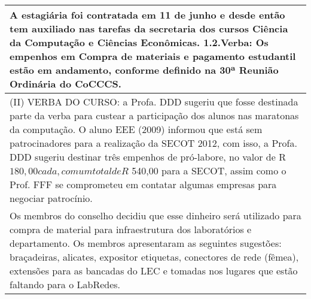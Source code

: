 \begin{longtable}{|p{17.5cm}|}
 \\ \hline 
A estagiária foi contratada em 11 de junho e desde então tem auxiliado nas tarefas da secretaria dos cursos Ciência da Computação e Ciências Econômicas. 1.2.Verba: Os empenhos em Compra de materiais e pagamento estudantil estão em andamento, conforme definido na 30ª Reunião Ordinária do CoCCCS.

 \\ \hline 
(II) VERBA DO CURSO: a Profa. DDD sugeriu que fosse destinada parte da verba para custear a participação dos alunos nas maratonas da computação. O aluno EEE (2009) informou que está sem patrocinadores para a realização da SECOT 2012, com isso, a Profa. DDD sugeriu destinar três empenhos de pró-labore, no valor de R$ 180,00 cada, com um total de R$ 540,00 para a SECOT, assim como o Prof. FFF se comprometeu em contatar algumas empresas para negociar patrocínio.

 \\ \hline 
Os membros do conselho decidiu que esse dinheiro será utilizado para compra de material para infraestrutura dos laboratórios e departamento. Os membros apresentaram as seguintes sugestões: braçadeiras, alicates, expositor etiquetas, conectores de rede (fêmea), extensões para as bancadas do LEC e tomadas nos lugares que estão faltando para o LabRedes.

 \\ \hline 

\end{longtable} 




